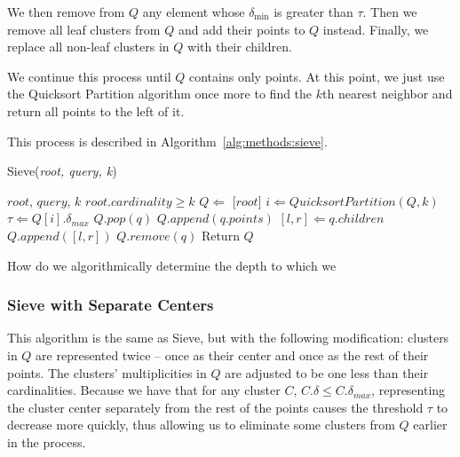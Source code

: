 We then remove from $Q$ any element whose $\delta_{\min}$ is greater than $\tau$.
Then we remove all leaf clusters from $Q$ and add their points to $Q$ instead.
Finally, we replace all non-leaf clusters in $Q$ with their children. 

We continue this process until $Q$ contains only points.
At this point, we just use the Quicksort Partition algorithm once more to find the $k$th nearest neighbor and return all points to the left of it.

This process is described in Algorithm~\ref{alg:methods:sieve}. 

\begin{algorithm} %
    \caption{Sieve(\emph{root, query, k})} %
    \label{alg:methods:sieve} %
    \begin{algorithmic} %
        \REQUIRE $root$, $query$, $k$
        \REQUIRE $root.cardinality \geq k$
        \STATE $Q \Leftarrow$ [$root$]
            \STATE $i \Leftarrow QuicksortPartition(Q, k)$
            \STATE $\tau \Leftarrow Q[i].\delta_{max}$
                    \STATE $Q.pop(q)$
                \ENDIF
            \ENDFOR
                    \STATE $Q.append(q.points)$
                \ELSE
                    \STATE $[l, r] \Leftarrow q.children$
                    \STATE $Q.append([l, r])$   
                \ENDIF
                \STATE $Q.remove(q)$
            \ENDFOR 
        \ENDWHILE
        \STATE Return $Q$
    \end{algorithmic}How do we algorithmically determine the depth to which we
\end{algorithm}


\subsubsection{Sieve with Separate Centers}
\label{subsubsec:methods:knn-search:sieve2}

This algorithm is the same as Sieve, but with the following modification:
clusters in $Q$ are represented twice -- once as their center and once as the rest of their points.
The clusters' multiplicities in $Q$ are adjusted to be one less than their cardinalities.
Because we have that for any cluster $C$, $C.\delta \leq C.\delta_{max}$, representing the cluster center separately from the rest of the points causes the threshold $\tau$ to decrease more quickly, thus allowing us to eliminate some clusters from $Q$ earlier in the process. 


